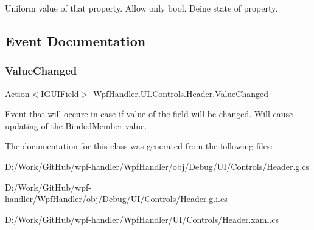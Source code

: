 Uniform value of that property. Allow only bool. Deine state of  property. 



\subsection{Event Documentation}
\mbox{\label{class_wpf_handler_1_1_u_i_1_1_controls_1_1_header_a0934846d1b0bafdabb4997d47fb01b6c}} 
\subsubsection{\texorpdfstring{Value\+Changed}{ValueChanged}}
{\footnotesize\ttfamily Action$<$\mbox{\hyperlink{interface_wpf_handler_1_1_u_i_1_1_auto_layout_1_1_i_g_u_i_field}{I\+G\+U\+I\+Field}}$>$ Wpf\+Handler.\+U\+I.\+Controls.\+Header.\+Value\+Changed}



Event that will occure in case if value of the field will be changed. Will cause updating of the Binded\+Member value. 



The documentation for this class was generated from the following files\+:\begin{DoxyCompactItemize}
\item 
D\+:/\+Work/\+Git\+Hub/wpf-\/handler/\+Wpf\+Handler/obj/\+Debug/\+U\+I/\+Controls/Header.\+g.\+cs\item 
D\+:/\+Work/\+Git\+Hub/wpf-\/handler/\+Wpf\+Handler/obj/\+Debug/\+U\+I/\+Controls/Header.\+g.\+i.\+cs\item 
D\+:/\+Work/\+Git\+Hub/wpf-\/handler/\+Wpf\+Handler/\+U\+I/\+Controls/Header.\+xaml.\+cs\end{DoxyCompactItemize}

